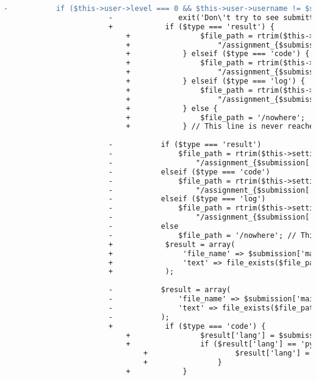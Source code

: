 \begin{lstlisting}[language=diff, caption=Perubahan pada kode Submissions.php]
						-			if ($this->user->level === 0 && $this->user->username != $submission['username'])
						-				exit('Don\'t try to see submitted codes :)');
						+            if ($type === 'result') {
							+                $file_path = rtrim($this->settings_model->get_setting('assignments_root'), '/').
							+                    "/assignment_{$submission['assignment']}/p{$submission['problem']}/{$submission['username']}/result-{$submission['submit_id']}.html";
							+            } elseif ($type === 'code') {
							+                $file_path = rtrim($this->settings_model->get_setting('assignments_root'), '/').
							+                    "/assignment_{$submission['assignment']}/p{$submission['problem']}/{$submission['username']}/{$submission['file_name']}.".filetype_to_extension($submission['file_type']);
							+            } elseif ($type === 'log') {
							+                $file_path = rtrim($this->settings_model->get_setting('assignments_root'), '/').
							+                    "/assignment_{$submission['assignment']}/p{$submission['problem']}/{$submission['username']}/log-{$submission['submit_id']}";
							+            } else {
							+                $file_path = '/nowhere';
							+            } // This line is never reached!
						
						-			if ($type === 'result')
						-				$file_path = rtrim($this->settings_model->get_setting('assignments_root'),'/').
						-					"/assignment_{$submission['assignment']}/p{$submission['problem']}/{$submission['username']}/result-{$submission['submit_id']}.html";
						-			elseif ($type === 'code')
						-				$file_path = rtrim($this->settings_model->get_setting('assignments_root'),'/').
						-					"/assignment_{$submission['assignment']}/p{$submission['problem']}/{$submission['username']}/{$submission['file_name']}.".filetype_to_extension($submission['file_type']);
						-			elseif ($type === 'log')
						-				$file_path = rtrim($this->settings_model->get_setting('assignments_root'),'/').
						-					"/assignment_{$submission['assignment']}/p{$submission['problem']}/{$submission['username']}/log-{$submission['submit_id']}";
						-			else
						-				$file_path = '/nowhere'; // This line is never reached!
						+            $result = array(
						+                'file_name' => $submission['main_file_name'].'.'.filetype_to_extension($submission['file_type']),
						+                'text' => file_exists($file_path) ? file_get_contents($file_path) : 'File Not Found'
						+            );
						
						-			$result = array(
						-				'file_name' => $submission['main_file_name'].'.'.filetype_to_extension($submission['file_type']),
						-				'text' => file_exists($file_path)?file_get_contents($file_path):'File Not Found'
						-			);
						+            if ($type === 'code') {
							+                $result['lang'] = $submission['file_type'];
							+                if ($result['lang'] == 'py2' || $result['lang'] == 'py3') {
								+                    $result['lang'] = 'python';
								+                }
							+            }
						

\end{lstlisting}
